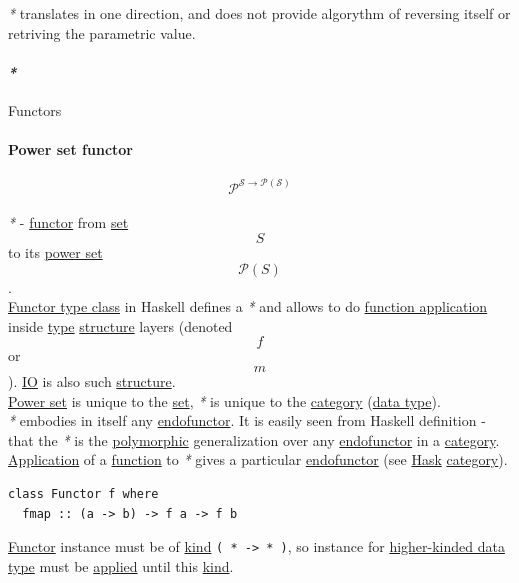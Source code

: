 \documentclass[11pt]{article}
\begin{document}
\emph{*} translates in one direction, and does not provide algorythm of reversing itself or retriving the parametric value.\\

\paragraph{\emph{*}}
\label{sec:org4a3e0e3}

\label{orgdd21ed6}Functors\\

\paragraph{\label{org4dcf273}Power set functor}
\label{sec:orgcaee5a0}
$$ \mathcal{P^{S \to P(S)}} $$\\

\emph{*} - \hyperref[orgf2f6841]{functor} from \hyperref[org1faf06d]{set} $$ S $$ to its \hyperref[org8dd7cb1]{power set} $$ \mathcal{P}(S) $$.\\

\hyperref[org67c1dcb]{Functor type class} in Haskell defines a \emph{*} and allows to do \hyperref[org6aac242]{function application} inside \hyperref[orgc4aea2f]{type} \hyperref[org8051f61]{structure} layers (denoted $$ f $$ or $$ m $$). \hyperref[orga8c8a87]{IO} is also such \hyperref[org8051f61]{structure}.\\
\hyperref[org8dd7cb1]{Power set} is unique to the \hyperref[org1faf06d]{set}, \emph{*} is unique to the \hyperref[org0450535]{category} (\hyperref[org212d9c3]{data type}).\\
\emph{*} embodies in itself any \hyperref[orga4a1776]{endofunctor}. It is easily seen from Haskell definition - that the \emph{*} is the \hyperref[orgac4d581]{polymorphic} generalization over any \hyperref[orga4a1776]{endofunctor} in a \hyperref[org0450535]{category}. \hyperref[org2b89e66]{Application} of a \hyperref[orge15bc14]{function} to \emph{*} gives a particular \hyperref[orga4a1776]{endofunctor} (see \hyperref[org02813f7]{Hask} \hyperref[org0450535]{category}).\\

\begin{verbatim}
class Functor f where
  fmap :: (a -> b) -> f a -> f b
\end{verbatim}

\hyperref[orgf2f6841]{Functor} instance must be of \hyperref[orgd0eb143]{kind} \texttt{( * -> * )}, so instance for \hyperref[org4243f05]{higher-kinded data type} must be \hyperref[org7abd585]{applied} until this \hyperref[orgd0eb143]{kind}.\\
\end{document}
